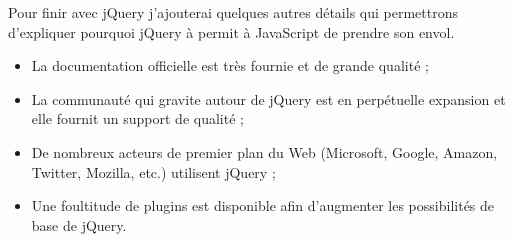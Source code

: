 Pour finir avec jQuery j'ajouterai quelques autres détails qui permettrons d'expliquer pourquoi jQuery à permit à JavaScript de prendre son envol.

\begin{itemize}

  \item[\textbullet]
  La documentation officielle est très fournie et de grande qualité ;
  
  \item[\textbullet]
  La communauté qui gravite autour de jQuery est en perpétuelle expansion et elle fournit un support de qualité ;
  
  \item[\textbullet]
  De nombreux acteurs de premier plan du Web (Microsoft, Google, Amazon, Twitter, Mozilla, etc.) utilisent jQuery ;
  
  \item[\textbullet]
  Une foultitude de plugins est disponible afin d'augmenter les possibilités de base de jQuery.  
  
\end{itemize}